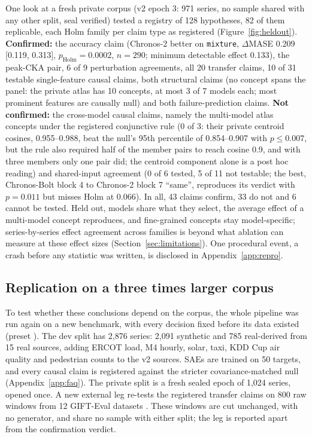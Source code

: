One look at a fresh private corpus (v2 epoch 3: 971 series, no sample shared with any other split, seal verified)
tested a registry of 128 hypotheses, 82 of them replicable, each Holm family per claim type as registered
(Figure~\ref{fig:heldout}). \textbf{Confirmed:} the accuracy claim (Chronos-2 better on \texttt{mixture}, $\Delta$MASE 0.209
[0.119, 0.313], $p_{\text{Holm}}=0.0002$, $n=290$; minimum detectable effect 0.133), the peak-CKA pair, 6 of 9
perturbation agreements, all 20 transfer claims, 10 of 31 testable single-feature causal claims, both structural claims
(no concept spans the panel: the private atlas has 10 concepts, at most 3 of 7 models each; most prominent features are
causally null) and both failure-prediction claims. \textbf{Not confirmed:} the cross-model causal claims, namely the
multi-model atlas concepts under the registered conjunctive rule (0 of 3: their private centroid cosines, 0.955--0.988,
beat the null's 95th percentile of 0.854--0.907 with $p\le0.007$, but the rule also required half of the member pairs to
reach cosine 0.9, and with three members only one pair did; the centroid component alone is a post hoc reading) and shared-input agreement (0 of 6 tested, 5 of 11 not testable; the best, Chronos-Bolt block 4
to Chronos-2 block 7 ``same'', reproduces its verdict with $p=0.011$ but misses Holm at 0.066). In all, 43 claims
confirm, 33 do not and 6 cannot be tested. Held out, models share what they select, the average effect of a multi-model concept
reproduces, and fine-grained concepts stay model-specific; series-by-series effect agreement across families is beyond what ablation can measure at these effect sizes
(Section~\ref{sec:limitations}). One procedural event, a crash before any statistic was written,
is disclosed in Appendix~\ref{app:repro}.


\subsection{Replication on a three times larger corpus}
\label{sec:v3}

To test whether these conclusions depend on the corpus, the whole pipeline was run again on a new benchmark, with every
decision fixed before its data existed (preset ). The dev split has 2{,}876
series: 2{,}091 synthetic and 785 real-derived from 15 real sources, adding ERCOT load, M4 hourly, solar, taxi, KDD Cup
air quality and pedestrian counts to the v2 sources. SAEs are trained on 50 targets, and every causal claim is registered
against the stricter covariance-matched null (Appendix~\ref{app:faq}). The private split is a fresh sealed epoch of
1{,}024 series, opened once. A new external leg re-tests the registered transfer claims on 800 raw windows from 12
GIFT-Eval datasets \citep{aksu2024gifteval}. These windows are cut unchanged, with no generator, and share no sample
with either split; the leg is reported apart from the confirmation verdict.

